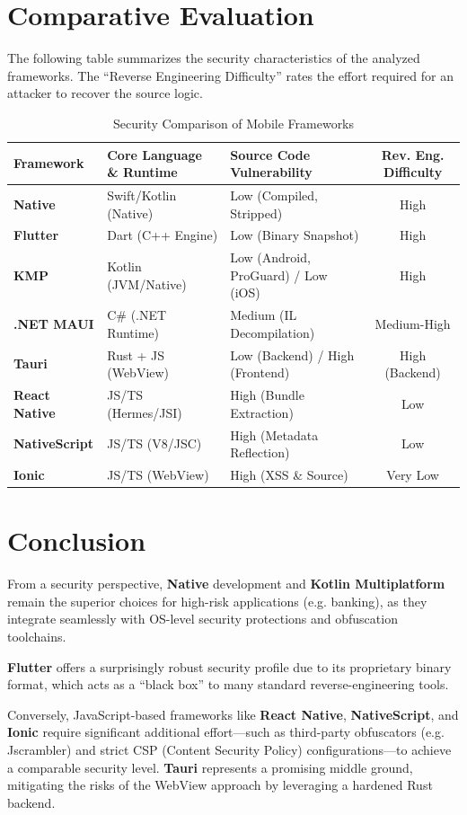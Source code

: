 \section{Comparative Evaluation}

The following table summarizes the security characteristics of the analyzed frameworks. The ``Reverse Engineering Difficulty'' rates the effort required for an attacker to recover the source logic.

\begin{table}[h!]
\centering
\begin{tabular}{|l|p{3.5cm}|p{3.5cm}|c|}
\hline
\textbf{Framework} & \textbf{Core Language \& Runtime} & \textbf{Source Code Vulnerability} & \textbf{Rev. Eng. Difficulty} \\ \hline
\textbf{Native} & Swift/Kotlin (Native) & Low (Compiled, Stripped) & High \\ \hline
\textbf{Flutter} & Dart (C++ Engine) & Low (Binary Snapshot) & High \\ \hline
\textbf{KMP} & Kotlin (JVM/Native) & Low (Android, ProGuard) / Low (iOS) & High \\ \hline
\textbf{.NET MAUI} & C\# (.NET Runtime) & Medium (IL Decompilation) & Medium-High \\ \hline
\textbf{Tauri} & Rust + JS (WebView) & Low (Backend) / High (Frontend) & High (Backend) \\ \hline
\textbf{React Native} & JS/TS (Hermes/JSI) & High (Bundle Extraction) & Low \\ \hline
\textbf{NativeScript} & JS/TS (V8/JSC) & High (Metadata Reflection) & Low \\ \hline
\textbf{Ionic} & JS/TS (WebView) & High (XSS \& Source) & Very Low \\ \hline
\end{tabular}
\caption{Security Comparison of Mobile Frameworks}
\label{tab:security_comparison}
\end{table}

\section{Conclusion}
From a security perspective, \textbf{Native} development and \textbf{Kotlin Multiplatform} remain the superior choices for high-risk applications (e.g. banking), as they integrate seamlessly with OS-level security protections and obfuscation toolchains. 

\textbf{Flutter} offers a surprisingly robust security profile due to its proprietary binary format, which acts as a ``black box'' to many standard reverse-engineering tools. 

Conversely, JavaScript-based frameworks like \textbf{React Native}, \textbf{NativeScript}, and \textbf{Ionic} require significant additional effort—such as third-party obfuscators (e.g. Jscrambler) and strict CSP (Content Security Policy) configurations—to achieve a comparable security level. \textbf{Tauri} represents a promising middle ground, mitigating the risks of the WebView approach by leveraging a hardened Rust backend.
